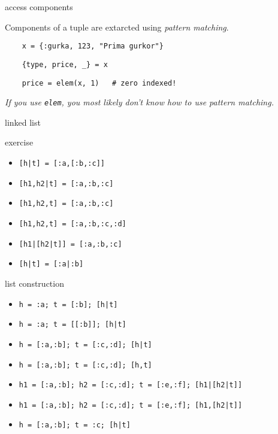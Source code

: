\begin{frame}[fragile]{access components}

  Components of a tuple are extarcted using {\em pattern matching}.\pause

  \begin{lstlisting}
    x = {:gurka, 123, "Prima gurkor"}
  \end{lstlisting}

  \pause
  \vspace{20pt}

  \begin{lstlisting}
    {type, price, _} = x 
  \end{lstlisting}  

  \vspace{20pt}

  \begin{lstlisting}
    price = elem(x, 1)   # zero indexed!
  \end{lstlisting}    

  \vspace{10pt}
  {\em If you use {\tt elem}, you most likely don't know how to use pattern matching.}
  
\end{frame}




\begin{frame}{linked list}

\end{frame}


\begin{frame}{exercise}
\begin{itemize}
\pause \item  {\tt [h|t] = [:a,[:b,:c]]}  
\pause \item  {\tt [h1,h2|t] = [:a,:b,:c]} 
\pause \item  {\tt [h1,h2,t] = [:a,:b,:c]} 
\pause \item  {\tt [h1,h2,t] = [:a,:b,:c,:d]} 
\pause \item  {\tt [h1|[h2|t]] = [:a,:b,:c]}
\pause \item  {\tt [h|t] = [:a|:b]}
\end{itemize}
\end{frame}

\begin{frame}{list construction}
\begin{itemize}
\pause \item  {\tt h = :a; t = [:b]; [h|t]}
\pause \item  {\tt h = :a; t = [[:b]]; [h|t]}
\pause \item  {\tt h = [:a,:b]; t = [:c,:d]; [h|t]}
\pause \item  {\tt h = [:a,:b]; t = [:c,:d]; [h,t]}
\pause \item  {\tt h1 = [:a,:b]; h2 = [:c,:d]; t = [:e,:f]; [h1|[h2|t]]}
\pause \item  {\tt h1 = [:a,:b]; h2 = [:c,:d]; t = [:e,:f]; [h1,[h2|t]]}
\pause \item  {\tt h = [:a,:b]; t = :c; [h|t]}
\end{itemize}
\end{frame}


